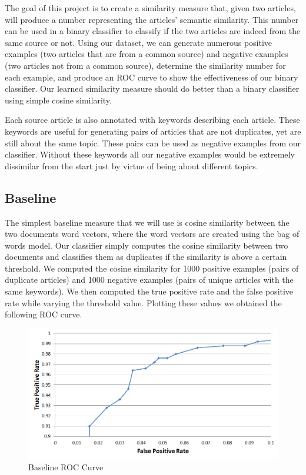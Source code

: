 \documentclass[11pt,letterpaper,oneside, titlepage]{scrartcl}
\begin{document}
The goal of this project is to create a similarity measure that, given two articles, will produce a number representing the articles' semantic similarity. This number can be used in a binary classifier to classify if the two articles are indeed from the same source or not. Using our dataset, we can generate numerous positive examples (two articles that are from a common source) and negative examples (two articles not from a common source), determine the similarity number for each example, and produce an ROC curve to show the effectiveness of our binary classifier. Our learned similarity measure should do better than a binary classifier using simple cosine similarity.

Each source article is also annotated with keywords describing each article. These keywords are useful for generating pairs of articles that are not duplicates, yet are still about the same topic. These pairs can be used as negative examples from our classifier. Without these keywords all our negative examples would be extremely dissimilar from the start just by virtue of being about different topics.

\subsection{Baseline}

The simplest baseline measure that we will use is cosine similarity between the two documents word vectors, where the word vectors are created using the bag of words model. Our classifier simply computes the cosine similarity between two documents and classifies them as duplicates if the similarity is above a certain threshold. We computed the cosine similarity for 1000 positive examples (pairs of duplicate articles) and 1000 negative examples (pairs of unique articles with the same keywords). We then computed the true positive rate and the false positive rate while varying the threshold value. Plotting these values we obtained the following ROC curve.

\begin{figure}[h!]
  \centering
  \includegraphics[width=1\textwidth]{baseline_ROC}
  \caption{Baseline ROC Curve}
  \label{fig:baseline_ROC}
\end{figure}
\end{document}
